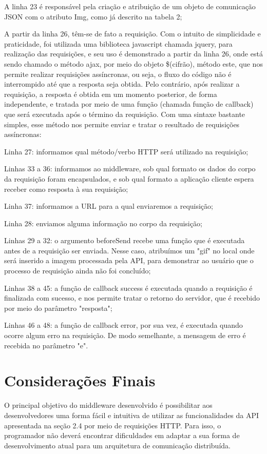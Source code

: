 \documentclass[12pt]{article}
\begin{document}
A linha 23 é responsável pela criação e atribuição de um objeto de comunicação JSON com o atributo Img, como já descrito na tabela 2; 

A partir da linha 26, têm-se de fato a requisição. Com o intuito de simplicidade e praticidade, foi utilizada uma biblioteca javascript chamada jquery, para realização das requisições, e seu uso é demonstrado a partir da linha 26, onde está sendo chamado o método ajax, por meio do objeto \$(cifrão), método este, que nos permite realizar requisições assíncronas, ou seja, o fluxo do código não é interrompido até que a resposta seja obtida. Pelo contrário, após realizar a requisição, a resposta é obtida em um momento posterior, de forma independente, e tratada por meio de uma função (chamada função de callback) que será executada após o término da requisição. Com uma sintaxe bastante simples, esse método nos permite enviar e tratar o resultado de requisições assíncronas:

Linha 27: informamos qual método/verbo HTTP será utilizado na requisição;

Linhas 33 a 36: informamos ao middleware, sob qual formato os dados do corpo da requisição foram encapsulados, e sob qual formato a aplicação cliente espera receber como resposta à sua requisição;

Linha 37: informamos a URL para a qual enviaremos a requisição;

Linha 28: enviamos alguma informação no corpo da requisição;

Linhas 29 a 32: o argumento beforeSend recebe uma função que é executada antes de a requisição ser enviada. Nesse caso, atribuímos um "gif" no local onde será inserido a imagem processada pela API, para demonstrar ao usuário que o processo de requisição ainda não foi concluído;

Linhas 38 a 45: a função de callback success é executada quando a requisição é finalizada com sucesso, e nos permite tratar o retorno do servidor, que é recebido por meio do parâmetro "resposta";

Linhas 46 a 48: a função de callback error, por sua vez, é executada quando ocorre algum erro na requisição. De modo semelhante, a mensagem de erro é recebida no parâmetro "e".

\section{Considerações Finais}

O principal objetivo do middleware desenvolvido é possibilitar aos desenvolvedores uma forma fácil e intuitiva de utilizar as funcionalidades da API apresentada na seção 2.4 por meio de requisições HTTP. Para isso, o programador não deverá encontrar dificuldades em adaptar a sua forma de desenvolvimento atual para um arquitetura de comunicação distribuída.



\end{document}
